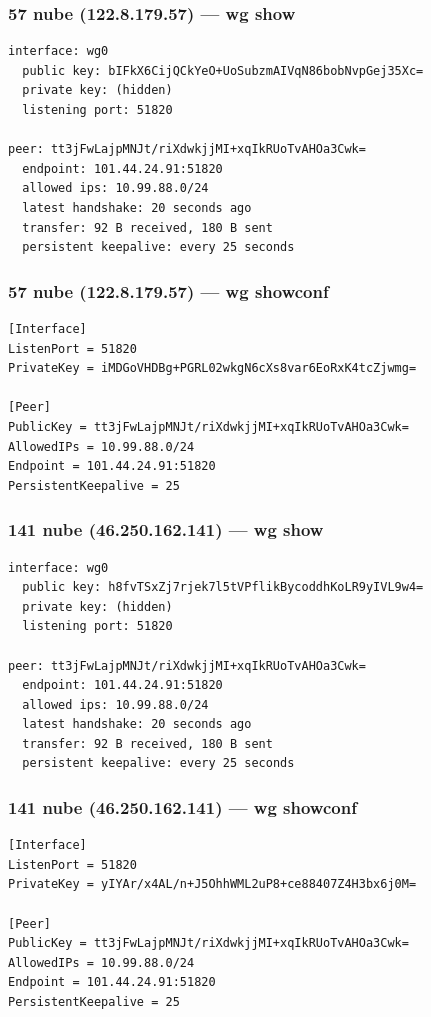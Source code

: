 \documentclass[11pt,a4paper]{article}
\begin{document}
\subsubsection*{57 nube (122.8.179.57) — wg show}
\begin{lstlisting}
interface: wg0
  public key: bIFkX6CijQCkYeO+UoSubzmAIVqN86bobNvpGej35Xc=
  private key: (hidden)
  listening port: 51820

peer: tt3jFwLajpMNJt/riXdwkjjMI+xqIkRUoTvAHOa3Cwk=
  endpoint: 101.44.24.91:51820
  allowed ips: 10.99.88.0/24
  latest handshake: 20 seconds ago
  transfer: 92 B received, 180 B sent
  persistent keepalive: every 25 seconds

\end{lstlisting}

\subsubsection*{57 nube (122.8.179.57) — wg showconf}
\begin{lstlisting}
[Interface]
ListenPort = 51820
PrivateKey = iMDGoVHDBg+PGRL02wkgN6cXs8var6EoRxK4tcZjwmg=

[Peer]
PublicKey = tt3jFwLajpMNJt/riXdwkjjMI+xqIkRUoTvAHOa3Cwk=
AllowedIPs = 10.99.88.0/24
Endpoint = 101.44.24.91:51820
PersistentKeepalive = 25

\end{lstlisting}

\subsubsection*{141 nube (46.250.162.141) — wg show}
\begin{lstlisting}
interface: wg0
  public key: h8fvTSxZj7rjek7l5tVPflikBycoddhKoLR9yIVL9w4=
  private key: (hidden)
  listening port: 51820

peer: tt3jFwLajpMNJt/riXdwkjjMI+xqIkRUoTvAHOa3Cwk=
  endpoint: 101.44.24.91:51820
  allowed ips: 10.99.88.0/24
  latest handshake: 20 seconds ago
  transfer: 92 B received, 180 B sent
  persistent keepalive: every 25 seconds

\end{lstlisting}

\subsubsection*{141 nube (46.250.162.141) — wg showconf}
\begin{lstlisting}
[Interface]
ListenPort = 51820
PrivateKey = yIYAr/x4AL/n+J5OhhWML2uP8+ce88407Z4H3bx6j0M=

[Peer]
PublicKey = tt3jFwLajpMNJt/riXdwkjjMI+xqIkRUoTvAHOa3Cwk=
AllowedIPs = 10.99.88.0/24
Endpoint = 101.44.24.91:51820
PersistentKeepalive = 25

\end{lstlisting}
\end{document}
